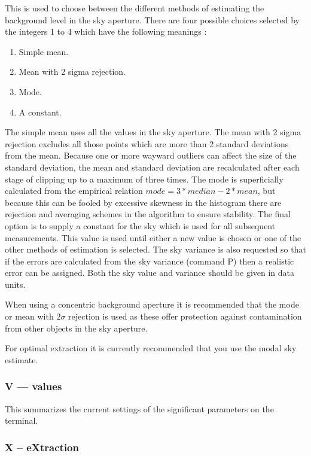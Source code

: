 \documentclass[twoside,11pt,nolof]{starlink}
\begin{document}
This is used to choose between the different methods of estimating the
background level in the sky aperture. There are four possible choices
selected by the integers 1 to 4 which have the following meanings :
\begin{enumerate}
\item Simple mean.
\item Mean with 2 sigma rejection.
\item Mode.
\item A constant.
\end{enumerate}
The simple mean uses all the values in the sky aperture. The mean with
2 sigma rejection excludes all those points which are more than 2
standard deviations from the mean. Because one or more wayward
outliers can affect the size of the standard deviation, the mean and
standard deviation are recalculated after each stage of clipping up to
a maximum of three times.  The mode is superficially calculated from
the empirical relation
$mode = 3 * median - 2 * mean$, but because this can be fooled by
excessive skewness in the histogram there are rejection and averaging
schemes in the algorithm to ensure stability. The final option is to
supply a constant for the sky which is used for all
subsequent measurements. This value is used until either a new value is
chosen or one of the other methods of estimation is selected. The sky
variance is also requested so that if the errors are calculated from the
sky variance (command P) then a realistic error can be assigned. Both
the sky value and variance should be given in data units.

When using a concentric background aperture it is recommended that the
mode or mean with $2\sigma$ rejection is used as these offer protection
against contamination from other objects in the sky aperture.

For optimal extraction it is currently recommended that you use the modal
sky estimate.


\subsubsection{V --- values}

This summarizes the current settings of the significant parameters on
the terminal.

\subsubsection{X -- eXtraction}
\end{document}
